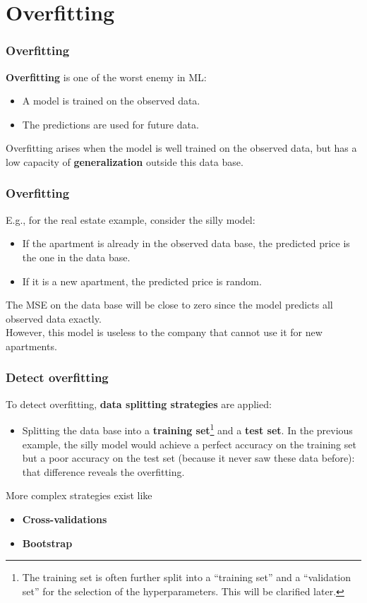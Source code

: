 \section{Overfitting}
\begin{frame}
\frametitle{Overfitting}
{\bf Overfitting} is one of the worst enemy in ML:
\begin{itemize}
\item A model is trained on the observed data. 
\item The predictions are used for future data.
\end{itemize}
Overfitting arises when the model is well trained on the observed data, but has a low capacity of {\bf generalization} outside this data base. 
\end{frame}
\begin{frame}
\frametitle{Overfitting}
E.g., for the real estate example, consider the silly model: 
\begin{itemize}
\item If the apartment is already in the observed data base, the predicted price is the one in the data base. 
\item If it is a new apartment, the predicted price is random. 
\end{itemize}
The MSE on the data base will be close to zero since the model predicts all observed data exactly. \\ 
\vspace{0.3cm}
However, this model is useless to the company that cannot use it for new apartments. 
\end{frame}
\begin{frame}
\frametitle{Detect overfitting}
To detect overfitting, {\bf data splitting strategies} are applied: 
\begin{itemize}
\item Splitting the data base into a {\bf training set}\footnote{The training set is often further split into a ``training set'' and a ``validation set'' for the selection of the hyperparameters. This will be clarified later.} and a {\bf test set}. In the previous example, the silly model would achieve a perfect accuracy on the training set but a poor accuracy on the test set (because it never saw these data before): that difference reveals the overfitting. 
\end{itemize}
More complex strategies exist like
\begin{itemize}
\item {\bf Cross-validations}
\item {\bf Bootstrap}
\end{itemize}
\end{frame}
